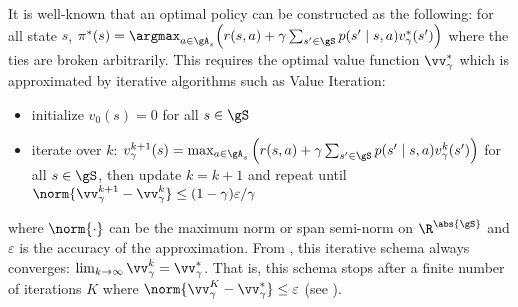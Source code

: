 It is well-known that an optimal policy can be constructed as the following: for all state $s$, $\pi^*(s)=\argmax_{a\in\gA_s}\Big(r(s, a) +\gamma\sum_{s'\in\gS}p(s'\mid s,a)v^*_\gamma(s')\Big)$ where the ties are broken arbitrarily.
This requires the optimal value function $\vv^*_\gamma$ which is approximated by iterative algorithms such as Value Iteration:
\begin{itemize}
    \item initialize $v_0(s)=0$ for all $s\in\gS$
    \item iterate over $k$: $v^{k+1}_\gamma(s) = \max_{a\in\gA_s}\Big(r(s,a)+\gamma\sum_{s'\in\gS}p(s'\mid s,a)v_{\gamma}^k(s')\Big)$ for all $s\in\gS$, then update $k=k+1$ and repeat until $\norm{\vv^{k+1}_\gamma-\vv^k_\gamma}\le(1-\gamma)\varepsilon/\gamma$
\end{itemize}
where $\norm{\cdot}$ can be the maximum norm or span semi-norm on $\R^{\abs{\gS}}$ and $\varepsilon$ is the accuracy of the approximation.
From \cite[Chapter~6]{puterman2014markov}, this iterative schema always converges: $\lim_{k\to\infty}\vv^k_\gamma=\vv^*_\gamma$.
That is, this schema stops after a finite number of iterations $K$ where $\norm{\vv^K_\gamma-\vv^*_\gamma}\le \varepsilon$ (see \cite[Theorem~6.3.1]{puterman2014markov}). 
%


